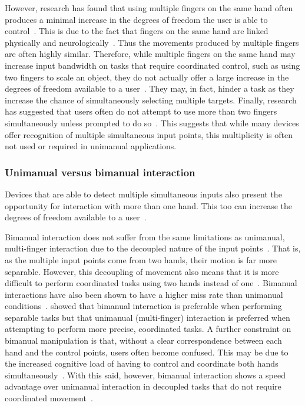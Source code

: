 However, research has found that using multiple fingers on the same hand often produces a minimal increase in the degrees of freedom the user is able to control~\citep{Mosc08}. This is due to the fact that fingers on the same hand are linked physically and neurologically~\citep{Mosc06}. Thus the movements produced by multiple fingers are often highly similar. Therefore, while multiple fingers on the same hand may increase input bandwidth on tasks that require coordinated control, such as using two fingers to scale an object, they do not actually offer a large increase in the degrees of freedom available to a user~\citep{Kin09}. They may, in fact, hinder a task as they increase the chance of simultaneously selecting multiple targets. Finally, research has suggested that users often do not attempt to use more than two fingers simultaneously unless prompted to do so~\citep{Kin09}. This suggests that while many devices offer recognition of multiple simultaneous input points, this multiplicity is often not used or required in unimanual applications.

\subsubsection{Unimanual versus bimanual interaction}
Devices that are able to detect multiple simultaneous inputs also present the opportunity for interaction with more than one hand. This too can increase the degrees of freedom available to a user~\citep{Kin09}.

Bimanual interaction does not suffer from the same limitations as unimanual, multi-finger interaction due to the decoupled nature of the input points~\citep{Mosc08}. That is, as the multiple input points come from two hands, their motion is far more separable. However, this decoupling of movement also means that it is more difficult to perform coordinated tasks using two hands instead of one~\citep{Mosc08}. Bimanual interactions have also been shown to have a higher miss rate than unimanual conditions~\citep{Kin09}. \citet{Mosc08} showed that bimanual interaction is preferable when performing separable tasks but that unimanual (multi-finger) interaction is preferred when attempting to perform more precise, coordinated tasks. A further constraint on bimanual manipulation is that, without a clear correspondence between each hand and the control points, users often become confused. This may be due to the increased cognitive load of having to control and coordinate both hands simultaneously~\citep{Kin09}. With this said, however, bimanual interaction shows a speed advantage over unimanual interaction in decoupled tasks that do not require coordinated movement~\citep{Kin09}.

